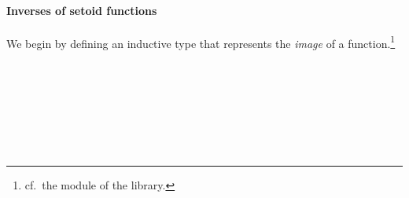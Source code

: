 \paragraph*{Inverses of setoid functions}
We begin by defining an inductive type that represents the \emph{image} of a function.\footnote{cf.~the  module of the \agdaalgebras library.}

\begin{code}%
\>[0]\<%
\\
\>[0]\AgdaSpace{}%
\AgdaModule{\AgdaUnderscore{}}\AgdaSpace{}%
\AgdaSymbol{\{}\AgdaSpace{}%
\AgdaSymbol{:}\AgdaSpace{}%
\AgdaSpace{}%
\AgdaSpace{}%
\AgdaSymbol{\}\{}\AgdaSpace{}%
\AgdaSymbol{:}\AgdaSpace{}%
\AgdaSpace{}%
\AgdaSpace{}%
\AgdaSymbol{\}}\AgdaSpace{}%
\<%
\\
\>[0][@{}l@{\AgdaIndent{0}}]%
\>[1]\AgdaSpace{}%
\AgdaSpace{}%
\AgdaSpace{}%
\AgdaSpace{}%
\AgdaSymbol{(}\AgdaSpace{}%
\AgdaSpace{}%
\AgdaSymbol{;}\AgdaSpace{}%
\AgdaSpace{}%
\AgdaSymbol{)}\AgdaSpace{}%
\AgdaSpace{}%
\AgdaSymbol{(}\AgdaSpace{}%
\AgdaSpace{}%
\AgdaSpace{}%
\AgdaSpace{}%
\AgdaSymbol{)}\<%
\\
%
\\[\AgdaEmptyExtraSkip]%
%
\>[1]\AgdaSpace{}%
\AgdaSpace{}%
\AgdaSymbol{(}\AgdaSpace{}%
\AgdaSymbol{:}\AgdaSpace{}%
\AgdaSpace{}%
\AgdaSpace{}%
\AgdaSymbol{)}\AgdaSpace{}%
\AgdaSymbol{:}\AgdaSpace{}%
\AgdaSpace{}%
\AgdaSpace{}%
\AgdaSpace{}%
\AgdaSymbol{(}\AgdaSpace{}%
\AgdaSpace{}%
\AgdaSpace{}%
\AgdaSpace{}%
\AgdaSymbol{)}\AgdaSpace{}%
\<%
\\
\>[1][@{}l@{\AgdaIndent{0}}]%
\>[2]\AgdaSpace{}%
\AgdaSymbol{:}\AgdaSpace{}%
\AgdaSymbol{\{}\AgdaSpace{}%
\AgdaSymbol{:}\AgdaSpace{}%
\AgdaSymbol{\}}\AgdaSpace{}%
\AgdaSpace{}%
\AgdaSpace{}%
\AgdaSpace{}%
\AgdaSpace{}%
\AgdaSpace{}%
\AgdaSpace{}%
\AgdaSpace{}%
\AgdaSpace{}%
\AgdaSpace{}%
\AgdaSpace{}%
\AgdaSpace{}%
\AgdaSpace{}%
\AgdaSpace{}%
\<%
\\
\>[0]\<%
\end{code}
